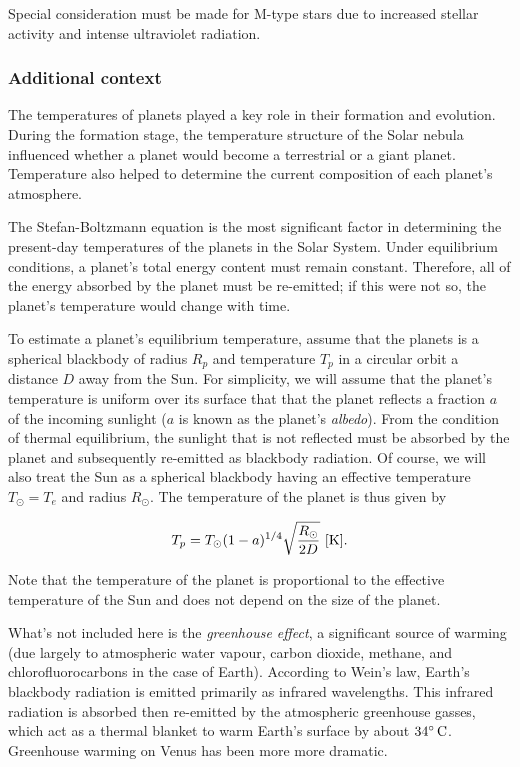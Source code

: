 \documentclass[a4paper,10pt]{article}
\begin{document}
{\noindent}Special consideration must be made for M-type stars due to increased stellar activity and intense ultraviolet radiation. 

\subsubsection{Additional context}

The temperatures of planets played a key role in their formation and evolution. During the formation stage, the temperature structure of the Solar nebula influenced whether a planet would become a terrestrial or a giant planet. Temperature also helped to determine the current composition of each planet's atmosphere.

{\noindent}The Stefan-Boltzmann equation is the most significant factor in determining the present-day temperatures of the planets in the Solar System. Under equilibrium conditions, a planet's total energy content must remain constant. Therefore, all of the energy absorbed by the planet must be re-emitted; if this were not so, the planet's temperature would change with time. 

{\noindent}To estimate a planet's equilibrium temperature, assume that the planets is a spherical blackbody of radius $R_p$ and temperature $T_p$ in a circular orbit a distance $D$ away from the Sun. For simplicity, we will assume that the planet's temperature is uniform over its surface that that the planet reflects a fraction $a$ of the incoming sunlight ($a$ is known as the planet's \textit{albedo}). From the condition of thermal equilibrium, the sunlight that is not reflected must be absorbed by the planet and subsequently re-emitted as blackbody radiation. Of course, we will also treat the Sun as a spherical blackbody having an effective temperature $T_\odot=T_e$ and radius $R_\odot$. The temperature of the planet is thus given by

\begin{align*}
    T_p = T_\odot (1-a)^{1/4}\sqrt{\frac{R_\odot}{2D}} ~ [{\rm K}].
\end{align*}

{\noindent}Note that the temperature of the planet is proportional to the effective temperature of the Sun and does not depend on the size of the planet.

{\noindent}What's not included here is the \textit{greenhouse effect}, a significant source of warming (due largely to atmospheric water vapour, carbon dioxide, methane, and chlorofluorocarbons in the case of Earth). According to Wein's law, Earth's blackbody radiation is emitted primarily as infrared wavelengths. This infrared radiation is absorbed then re-emitted by the atmospheric greenhouse gasses, which act as a thermal blanket to warm Earth's surface by about $34^\circ\,{\rm C}$. Greenhouse warming on Venus has been more more dramatic. 
\end{document}
